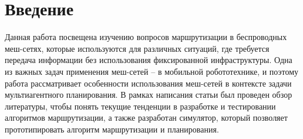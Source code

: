 \documentclass[%
]{report}
\begin{document}





\chapter*{Введение}
\label{sec:intro}

Данная работа посвещена изучению вопросов маршрутизации в беспроводных меш-сетях,
которые используются для различных ситуаций, где требуется передача информации без использования фиксированной инфраструктуры.
Одна из важных задач применения меш-сетей -- в мобильной робототехнике,
и поэтому работа рассматривает особенности использования меш-сетей в контексте задачи мультиагентного планирования.
В рамках написания статьи был проведен обзор литературы, чтобы понять текущие тенденции в разработке и тестировании
алгоритмов маршрутизации,
а также разработан симулятор,
который позволяет прототипировать алгоритм маршрутизации и планирования.
\end{document}

